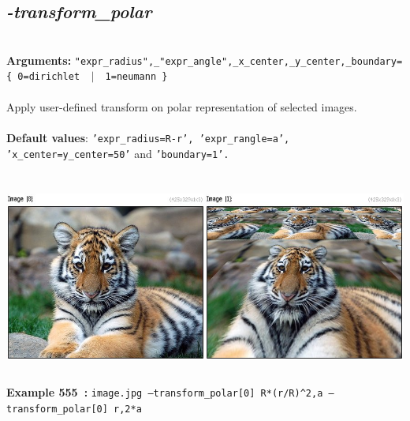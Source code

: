 \documentclass[a4paper,11pt,twoside]{book}
\begin{document}
\subsection{\emph{-transform\_polar} }\vspace*{-0.5em}
~\\\textbf{Arguments: } 
{\small \texttt{"expr\_radius",\_"expr\_angle",\_x\_center,\_y\_center,\_boundary=\{ 0=dirichlet ~$|$~ 1=neumann \}}}\\~\\
Apply user-defined transform on polar representation of selected images.
~\\~\\\textbf{Default values}: {\small \texttt{'expr\_radius=R-r', 'expr\_rangle=a', 'x\_center=y\_center=50'} and \texttt{'boundary=1'.}}
\begin{center}\includegraphics[keepaspectratio=true,height=7cm,width=\textwidth]{img/gmic_def555.jpg}\\
{\footnotesize \textbf{Example 555~:} \texttt{image.jpg --transform\_polar[0] R*(r/R)\textasciicircum 2,a --transform\_polar[0] r,2*a}}
\end{center}
\end{document}
